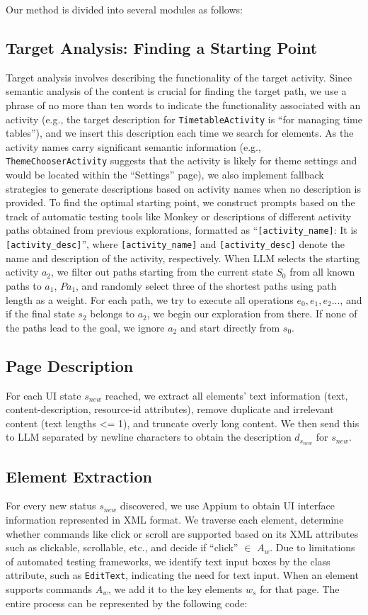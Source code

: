 \documentclass[conference]{IEEEtran}
\begin{document}
Our method is divided into several modules as follows:

\subsection{Target Analysis: Finding a Starting Point}
Target analysis involves describing the functionality of the target activity. Since semantic analysis of the content is crucial for finding the target path, we use a phrase of no more than ten words to indicate the functionality associated with an activity (e.g., the target description for \texttt{TimetableActivity} is ``for managing time tables''), and we insert this description each time we search for elements. As the activity names carry significant semantic information (e.g., \texttt{ThemeChooserActivity} suggests that the activity is likely for theme settings and would be located within the ``Settings'' page), we also implement fallback strategies to generate descriptions based on activity names when no description is provided. To find the optimal starting point, we construct prompts based on the track of automatic testing tools like Monkey or descriptions of different activity paths obtained from previous explorations, formatted as ``\texttt{[activity\_name]}: It is \texttt{[activity\_desc]}'', where \texttt{[activity\_name]} and \texttt{[activity\_desc]} denote the name and description of the activity, respectively. When LLM selects the starting activity $a_2$, we filter out paths starting from the current state $S_0$ from all known paths to $a_1$, $Pa_1$, and randomly select three of the shortest paths using path length as a weight. For each path, we try to execute all operations $e_0, e_1, e_2...$, and if the final state $s_2$ belongs to $a_2$, we begin our exploration from there. If none of the paths lead to the goal, we ignore $a_2$ and start directly from $s_0$.

\subsection{Page Description}
For each UI state $s_{new}$ reached, we extract all elements' text information (text, content-description, resource-id attributes), remove duplicate and irrelevant content (text lengths <= 1), and truncate overly long content. We then send this to LLM separated by newline characters to obtain the description $d_{s_{new}}$ for $s_{new}$.

\subsection{Element Extraction}
For every new status $s_{new}$ discovered, we use Appium to obtain UI interface information represented in XML format. We traverse each element, determine whether commands like click or scroll are supported based on its XML attributes such as clickable, scrollable, etc., and decide if ``click'' $\in$ $A_w$. Due to limitations of automated testing frameworks, we identify text input boxes by the class attribute, such as \texttt{EditText}, indicating the need for text input. When an element supports commands $A_w$, we add it to the key elements $w_s$ for that page. The entire process can be represented by the following code:
\end{document}
